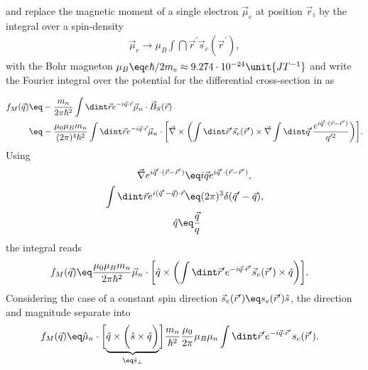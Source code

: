 \documentclass[\main/dresen_thesis.tex]{subfiles}
\begin{document}
and replace the magnetic moment of a single electron $\vec{\mu}_e$ at position $\vec{r}_i$ by the integral over a spin-density
\begin{align}
  \vec{\mu}_e \rightarrow \mu_B \int \dint \vec{r}^\prime \vec{s}_e(\vec{r}^\prime),
\end{align}
with the Bohr magneton $\mu_B \eq e\hbar / 2 m_e \approx 9.274 \cdot 10^{-24} \unit{JT^{-1}}$ and write the Fourier integral over the potential for the differential cross-section in  as

\begin{align}
  f_M (\vec{q}) \eq &- \frac{m_n}{2\pi \hbar^2} \int \dint \vec{r} e^{-i\vec{q} \cdot \vec{r}}\vec{\mu}_n \cdot \vec{B}_S (\vec{r})\\
  \eq &- \frac{\mu_0 \mu_B m_n}{(2\pi)^4 \hbar^2}  \int \dint \vec{r} e^{-i\vec{q} \cdot \vec{r}}\vec{\mu}_n \cdot \biggl[ \vec{\nabla} \times \biggl(\int \dint \vec{r}^\prime \vec{s}_e(\vec{r}^\prime) \times \vec{\nabla} \int \dint \vec{q}^\prime \frac{e^{i \vec{q}^\prime \cdot (\vec{r} - \vec{r}^\prime)}}{q^{\prime 2}} \biggr) \biggr].
\end{align}
Using
\begin{align}
  \vec{\nabla}e^{i \vec{q}^\prime \cdot (\vec{r} - \vec{r}^\prime)} \eq& i \vec{q} e^{i \vec{q}^\prime \cdot (\vec{r} - \vec{r}^\prime)},\\
  \int \dint \vec{r} e^{i(\vec{q}^\prime - \vec{q}) \cdot \vec{r}} \eq& (2 \pi)^3 \delta(\vec{q}^\prime - \vec{q}),\\
  \hat{q} \eq \frac{\vec{q}}{q}
\end{align}
the integral reads
\begin{align}
  f_M (\vec{q}) \eq & \frac{\mu_0 \mu_B m_n}{2 \pi \hbar^2} \vec{\mu}_n \cdot \biggl[ \hat{q} \times \biggl( \int \dint \vec{r}^\prime e^{- i \vec{q} \cdot \vec{r}^\prime} \vec{s}_e(\vec{r}^\prime) \times \hat{q}\biggr) \biggr].
\end{align}
Considering the case of a constant spin direction $\vec{s}_e (\vec{r}^\prime) \eq s_e (\vec{r}^\prime) \hat{s}$, the direction and magnitude separate into
\begin{align}
  f_M (\vec{q}) \eq & \hat{\mu}_n \cdot \biggl[ \underbrace{ \hat{q} \times \biggl( \hat{s} \times \hat{q}\biggr) }_{\eq \hat{s}_\perp}\biggr] \frac{m_n}{\hbar^2}  \frac{\mu_0}{2\pi} \mu_B \mu_n   \int \dint \vec{r}^\prime e^{- i \vec{q} \cdot \vec{r}^\prime} s_e(\vec{r}^\prime).
\end{align}
\end{document}

